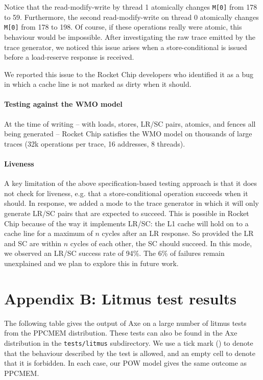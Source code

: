 \documentclass[11pt]{article}
\begin{document}
\noindent Notice that the read-modify-write by thread 1 atomically
changes \verb!M[0]! from 178 to 59.  Furthermore, the second
read-modify-write on thread 0 atomically changes \verb!M[0]! from 178
to 198.  Of course, if these operations really were atomic, this
behaviour would be impossible.  After investigating the raw trace
emitted by the trace generator, we noticed this issue arises when a
store-conditional is issued before a load-reserve response is
received.

We reported this issue to the Rocket Chip developers who
identified it as a bug in which a cache line is not marked as dirty
when it should.

\paragraph{Testing against the WMO model} At the time of writing --
with loads, stores, LR/SC pairs, atomics, and fences all being
generated -- Rocket Chip satisfies the WMO model on thousands of large
traces (32k operations per trace, 16 addresses, 8 threads).

\paragraph{Liveness} A key limitation of the above specification-based
testing approach is that it does not check for liveness, e.g. that a
store-conditional operation succeeds when it should.  In response, we
added a mode to the trace generator in which it will only generate
LR/SC pairs that are expected to succeed.  This is possible in Rocket
Chip because of the way it implements LR/SC: the L1 cache will hold on
to a cache line for a maximum of $n$ cycles after an LR response.  So
provided the LR and SC are within $n$ cycles of each other, the SC
should succeed.  In this mode, we observed an LR/SC success rate of
94\%.  The 6\% of failures remain unexplained and we plan to explore
this in future work.

\section*{Appendix B: Litmus test results}

The following table gives the output of Axe on a large number of
litmus tests from the PPCMEM distribution.  These tests can also be
found in the Axe distribution in the \verb#tests/litmus# subdirectory.
We use a tick mark (\cmark) to denote that the behaviour described by
the test is allowed, and an empty cell to denote that it is forbidden.
In each case, our POW model gives the same outcome as PPCMEM.  
\end{document}

